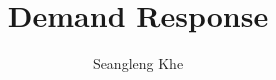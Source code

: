 \documentclass[aspectratio=169,11pt]{beamer}
\title{Demand Response}
\author{Seangleng Khe}
\begin{document}
\maketitle


\begin{frame}

\end{frame}


\begin{frame}

\end{frame}


\begin{frame}

\end{frame}


\begin{frame}

\end{frame}
\end{document}

